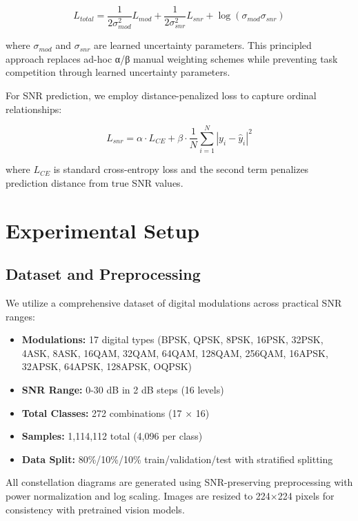\documentclass{ELSP}
\begin{document}
{{\begin{equation}
L_{total} = \frac{1}{2\sigma_{mod}^2} L_{mod} + \frac{1}{2\sigma_{snr}^2} L_{snr} + \log(\sigma_{mod}\sigma_{snr})
\end{equation}

where $\sigma_{mod}$ and $\sigma_{snr}$ are learned uncertainty parameters. This principled approach replaces ad-hoc α/β manual weighting schemes while preventing task competition through learned uncertainty parameters.

For SNR prediction, we employ distance-penalized loss to capture ordinal relationships:

\begin{equation}
L_{snr} = \alpha \cdot L_{CE} + \beta \cdot \frac{1}{N} \sum_{i=1}^{N} |y_i - \hat{y}_i|^2
\end{equation}

where $L_{CE}$ is standard cross-entropy loss and the second term penalizes prediction distance from true SNR values.

\section{Experimental Setup}

\subsection{Dataset and Preprocessing}

We utilize a comprehensive dataset of digital modulations across practical SNR ranges:
\begin{itemize}
    \item \textbf{Modulations:} 17 digital types (BPSK, QPSK, 8PSK, 16PSK, 32PSK, 4ASK, 8ASK, 16QAM, 32QAM, 64QAM, 128QAM, 256QAM, 16APSK, 32APSK, 64APSK, 128APSK, OQPSK)
    \item \textbf{SNR Range:} 0-30 dB in 2 dB steps (16 levels)
    \item \textbf{Total Classes:} 272 combinations (17 × 16)
    \item \textbf{Samples:} 1,114,112 total (4,096 per class)
    \item \textbf{Data Split:} 80\%/10\%/10\% train/validation/test with stratified splitting
\end{itemize}

All constellation diagrams are generated using SNR-preserving preprocessing with power normalization and log scaling. Images are resized to 224×224 pixels for consistency with pretrained vision models.

}}
\end{document}
